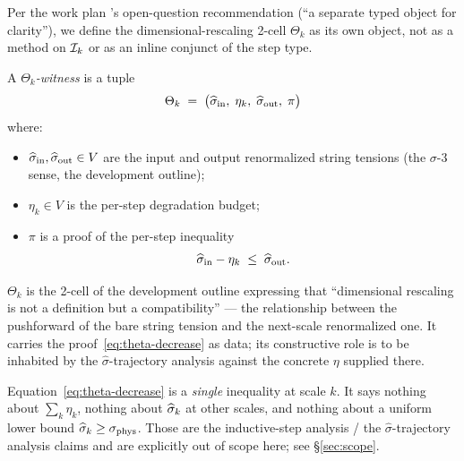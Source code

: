 Per the work plan 's open-question recommendation (``a separate typed object for clarity''), we define the dimensional-rescaling 2-cell $\Theta_k$ as its own object, not as a method on $\mathcal{I}_k$ or as an inline conjunct of the step type.

\begin{definition}
\label{def:two-cell-theta}
A \emph{$\Theta_k$-witness} is a tuple
\begin{equation*}
  \Theta_k \;=\; \bigl( \widehat{\sigma}_{\mathrm{in}}, \;\eta_k, \;\widehat{\sigma}_{\mathrm{out}}, \;\pi \bigr)
\end{equation*}
where:
\begin{itemize}
  \item $\widehat{\sigma}_{\mathrm{in}}, \widehat{\sigma}_{\mathrm{out}} \in V$ are the input and output renormalized string tensions (the $\sigma$-3 sense, the development outline);
  \item $\eta_k \in V$ is the per-step degradation budget;
  \item $\pi$ is a proof of the per-step inequality
  \begin{equation}
    \label{eq:theta-decrease}
    \widehat{\sigma}_{\mathrm{in}} - \eta_k \;\le\; \widehat{\sigma}_{\mathrm{out}}.
  \end{equation}
\end{itemize}
\end{definition}

\begin{remark}
$\Theta_k$ is the 2-cell of the development outline expressing that ``dimensional rescaling is not a definition but a compatibility'' --- the relationship between the pushforward of the bare string tension and the next-scale renormalized one.  It carries the proof~\eqref{eq:theta-decrease} as data; its constructive role is to be inhabited by the $\widehat\sigma$-trajectory analysis against the concrete $\eta$ supplied there.
\end{remark}

\begin{remark}
\label{rem:theta-per-step}
Equation~\eqref{eq:theta-decrease} is a \emph{single} inequality at scale $k$.  It says nothing about $\sum_k \eta_k$, nothing about $\widehat{\sigma}_k$ at other scales, and nothing about a uniform lower bound $\widehat{\sigma}_k \ge \sigma_{\mathrm{phys}}$.  Those are the inductive-step analysis / the $\widehat\sigma$-trajectory analysis claims and are explicitly out of scope here; see \S\ref{sec:scope}.
\end{remark}

